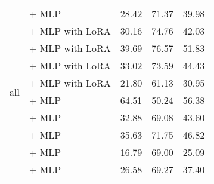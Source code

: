 \begin{longtable}{llccc}
    \multirow{10}{*}{all}                 & \citep{radford2019language} + MLP                                  & 28.42                                & 71.37              & 39.98             \\
                                          & \citep{llama3.2-1b-instruct} + MLP with LoRA                       & 30.16                                & 74.76              & 42.03             \\
                                          & \citep{abdin2024phi3technicalreporthighly} + MLP with LoRA         & 39.69                                & 76.57              & 51.83             \\
                                          & \citep{qwen2.5} + MLP with LoRA                                    & 33.02                                & 73.59              & 44.43             \\
                                          & \citep{gemma_2024} + MLP with LoRA                                 & 21.80                                & 61.13              & 30.95             \\
                                          & \citep{DBLP:journals/corr/abs-1911-02116} + MLP                    & 64.51                                & 50.24              & 56.38             \\
                                          & \citep{DBLP:journals/corr/abs-1910-13461} + MLP                    & 32.88                                & 69.08              & 43.60             \\
                                          & \citep{DBLP:journals/corr/abs-1810-04805} + MLP                    & 35.63                                & 71.75              & 46.82             \\
                                          & \citep{dai2020funneltransformer} + MLP                             & 16.79                                & 69.00              & 25.09             \\
                                          & \citep{clark2020electra} + MLP                                     & 26.58                                & 69.27              & 37.40             \\


\end{longtable}
